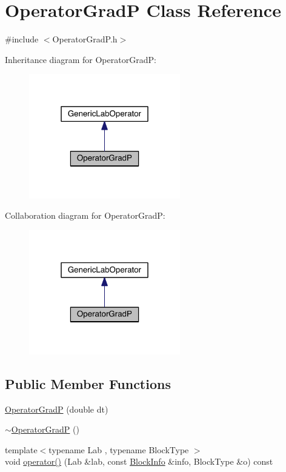 \hypertarget{class_operator_grad_p}{}\section{Operator\+Grad\+P Class Reference}
\label{class_operator_grad_p}


{\ttfamily \#include $<$Operator\+Grad\+P.\+h$>$}



Inheritance diagram for Operator\+Grad\+P\+:\nopagebreak
\begin{figure}[H]
\begin{center}
\leavevmode
\includegraphics[width=187pt]{da/d8c/class_operator_grad_p__inherit__graph}
\end{center}
\end{figure}


Collaboration diagram for Operator\+Grad\+P\+:\nopagebreak
\begin{figure}[H]
\begin{center}
\leavevmode
\includegraphics[width=187pt]{d5/da5/class_operator_grad_p__coll__graph}
\end{center}
\end{figure}
\subsection*{Public Member Functions}
\begin{DoxyCompactItemize}
\item 
\hyperlink{class_operator_grad_p_a90f6bdde5a07401f14be380ef6cf13e0}{Operator\+Grad\+P} (double dt)
\item 
\hyperlink{class_operator_grad_p_a1e88f7317d635f1f842158663b197911}{$\sim$\+Operator\+Grad\+P} ()
\item 
{\footnotesize template$<$typename Lab , typename Block\+Type $>$ }\\void \hyperlink{class_operator_grad_p_a0783ffd9da959ff251913634ebd16487}{operator()} (Lab \&lab, const \hyperlink{struct_block_info}{Block\+Info} \&info, Block\+Type \&o) const 
\end{DoxyCompactItemize}
